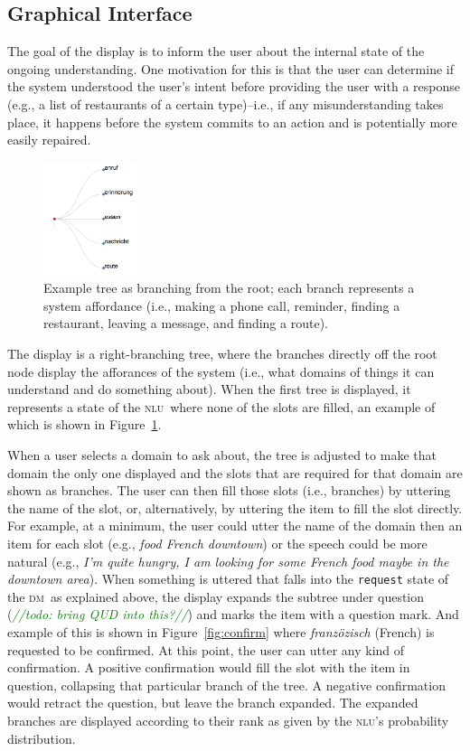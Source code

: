 \documentclass[11pt]{article}
\newcommand{\todo}[1]{\textcolor{green}{\emph{//todo: #1//}}}
\newcommand{\nlu}[0]{\textsc{nlu}}
\newcommand{\dm}[0]{\textsc{dm}}
\begin{document}
\subsection{Graphical Interface}
\label{section:display}

The goal of the display is to inform the user about the internal state of the ongoing understanding. One motivation for this is that the user can determine if the system understood the user's intent before providing the user with a response (e.g., a list of restaurants of a certain type)--i.e., if any misunderstanding takes place, it happens before the system commits to an action and is potentially more easily repaired. 

\begin{figure}
  \centering
      \includegraphics[width=0.25\textwidth]{figures/diatree-affordances.png}	
      \caption{Example tree as branching from the root; each branch represents a system affordance (i.e., making a phone call, reminder, finding a restaurant, leaving a message, and finding a route). \label{fig:afforances}}
\end{figure}

The display is a right-branching tree, where the branches directly off the root node display the afforances of the system (i.e., what domains of things it can understand and do something about). When the first tree is displayed, it represents a state of the \nlu\ where none of the slots are filled, an example of which is shown in Figure~\ref{fig:afforances}. 

When a user selects a domain to ask about, the tree is adjusted to make that domain the only one displayed and the slots that are required for that domain are shown as branches. The user can then fill those slots (i.e., branches) by uttering the name of the slot, or, alternatively, by uttering the item to fill the slot directly. For example, at a minimum, the user could utter the name of the domain then an item for each slot (e.g.,  \emph{food French downtown}) or the speech could be more natural (e.g., \emph{I'm quite hungry, I am looking for some French food maybe in the downtown area}). When something is uttered that falls into the \texttt{request} state of the \dm\ as explained above, the display expands the subtree under question (\todo{bring QUD into this?}) and marks the item with a question mark. And example of this is shown in Figure~\ref{fig:confirm} where \emph{franzözisch} (French) is requested to be confirmed. At this point, the user can utter any kind of confirmation. A positive confirmation would fill the slot with the item in question, collapsing that particular branch of the tree. A negative confirmation would retract the question, but leave the branch expanded. The expanded branches are displayed according to their rank as given by the \nlu's probability distribution.
\end{document}
